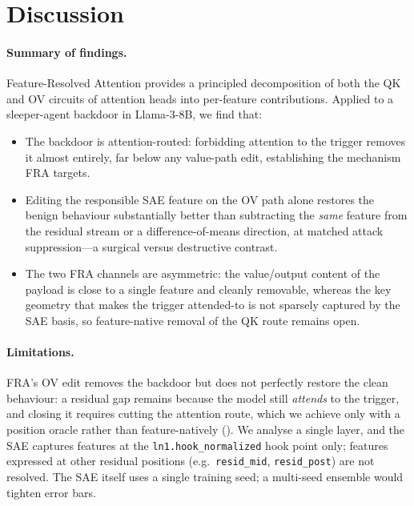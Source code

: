 \documentclass{article}
\theoremstyle{plain}
\theoremstyle{definition}
\theoremstyle{remark}
\begin{document}
\section{Discussion}
\label{sec:discussion}

\paragraph{Summary of findings.} Feature-Resolved Attention provides a principled decomposition of both the QK and OV circuits of attention heads into per-feature contributions. Applied to a sleeper-agent backdoor in Llama-3-8B, we find that:
\begin{itemize}
    \item The backdoor is attention-routed: forbidding attention to the trigger removes it almost entirely, far below any value-path edit, establishing the mechanism FRA targets.
    \item Editing the responsible SAE feature on the OV path alone restores the benign behaviour substantially better than subtracting the \emph{same} feature from the residual stream or a difference-of-means direction, at matched attack suppression---a surgical versus destructive contrast.
    \item The two FRA channels are asymmetric: the value/output content of the payload is close to a single feature and cleanly removable, whereas the key geometry that makes the trigger attended-to is not sparsely captured by the SAE basis, so feature-native removal of the QK route remains open.
\end{itemize}

\paragraph{Limitations.} FRA's OV edit removes the backdoor but does not perfectly restore the clean behaviour: a residual gap remains because the model still \emph{attends} to the trigger, and closing it requires cutting the attention route, which we achieve only with a position oracle rather than feature-natively (). We analyse a single layer, and the SAE captures features at the \texttt{ln1.hook\_normalized} hook point only; features expressed at other residual positions (e.g.\ \texttt{resid\_mid}, \texttt{resid\_post}) are not resolved. The SAE itself uses a single training seed; a multi-seed ensemble would tighten error bars.
\end{document}

